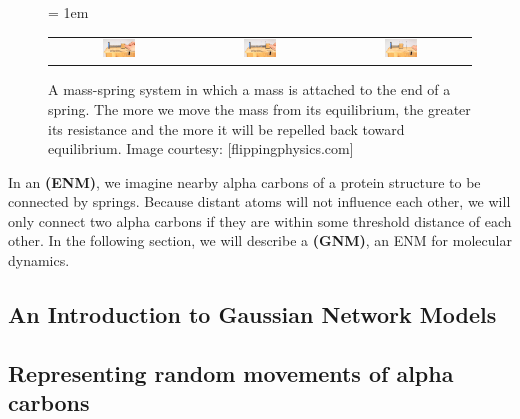 \begin{figure}[h]
	\centering
	\tabcolsep = 1em
	\mySfFamily
	\begin{tabular}{c c c}
		\includegraphics[width = 0.25\textwidth]{../images/mass_spring1.png} & \includegraphics[width = 0.25\textwidth]{../images/mass_spring2.png} & \includegraphics[width = 0.25\textwidth]{../images/mass_spring3.png}
	\end{tabular}
	\caption{A mass-spring system in which a mass is attached to the end of a spring. The more we move the mass from its equilibrium, the greater its resistance and the more it will be repelled back toward equilibrium. Image courtesy: [flippingphysics.com]}
	\label{fig:mass-spring}
\end{figure}


In an  \textbf{(ENM)}, we imagine nearby alpha carbons of a protein structure to be connected by springs. Because distant atoms will not influence each other, we will only connect two alpha carbons if they are within some threshold distance of each other. In the following section, we will describe a  \textbf{(GNM)}, an ENM for molecular dynamics.

\FloatBarrier
{}
\subsection{An Introduction to Gaussian Network Models}

\FloatBarrier
{}
\subsection{Representing random movements of alpha carbons}

